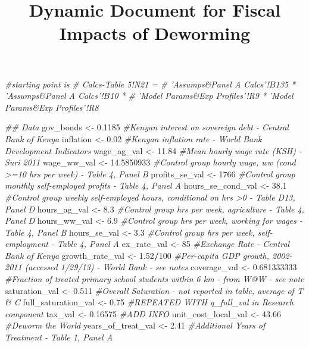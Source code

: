 \documentclass[]{article}
\title{Dynamic Document for Fiscal Impacts of Deworming}
\author{}
\date{}
\newenvironment{Shaded}{\begin{snugshade}}{\end{snugshade}}
\newcommand{\CommentTok}[1]{\textcolor[rgb]{0.56,0.35,0.01}{\textit{#1}}}
\newcommand{\DecValTok}[1]{\textcolor[rgb]{0.00,0.00,0.81}{#1}}
\newcommand{\FloatTok}[1]{\textcolor[rgb]{0.00,0.00,0.81}{#1}}
\newcommand{\NormalTok}[1]{#1}
\newcommand{\OperatorTok}[1]{\textcolor[rgb]{0.81,0.36,0.00}{\textbf{#1}}}
\newcommand{\StringTok}[1]{\textcolor[rgb]{0.31,0.60,0.02}{#1}}
\begin{document}
\maketitle

\def\blue{\color{blue}}

\begin{Shaded}
\begin{Highlighting}[]
\CommentTok{#starting point is}
\CommentTok{# Calcs-Table 5!N21 =}
\CommentTok{# 'Assumps&Panel A Calcs'!$B$135 * 'Assumps&Panel A Calcs'!$B$10 * }
\CommentTok{# 'Model Params&Exp Profiles'!R9 * 'Model Params&Exp Profiles'!R8}
\end{Highlighting}
\end{Shaded}

\begin{Shaded}
\begin{Highlighting}[]
\CommentTok{## Data }
\NormalTok{gov_bonds <-}\StringTok{    }\FloatTok{0.1185}            \CommentTok{#Kenyan interest on sovereign debt - Central Bank of Kenya}
\NormalTok{inflation <-}\StringTok{  }\FloatTok{0.02}              \CommentTok{#Kenyan inflation rate - World Bank Development Indicators}
\NormalTok{wage_ag_val <-}\StringTok{  }\FloatTok{11.84}             \CommentTok{#Mean hourly wage rate (KSH) - Suri 2011 }
\NormalTok{wage_ww_val <-}\StringTok{  }\FloatTok{14.5850933}      \CommentTok{#Control group hourly wage, ww (cond >=10 hrs per week) - Table 4, Panel B}
\NormalTok{profits_se_val <-}\StringTok{ }\DecValTok{1766}          \CommentTok{#Control group monthly self-employed profits - Table 4, Panel A}
\NormalTok{hours_se_cond_val <-}\StringTok{ }\FloatTok{38.1}       \CommentTok{#Control group weekly self-employed hours, conditional on hrs >0 - Table D13, Panel D}
\NormalTok{hours_ag_val <-}\StringTok{ }\FloatTok{8.3}             \CommentTok{#Control group hrs per week, agriculture - Table 4, Panel D}
\NormalTok{hours_ww_val <-}\StringTok{ }\FloatTok{6.9}             \CommentTok{#Control group hrs per week, working for wages - Table 4, Panel B}
\NormalTok{hours_se_val <-}\StringTok{ }\FloatTok{3.3}             \CommentTok{#Control group hrs per week, self-employment - Table 4, Panel A}
\NormalTok{ex_rate_val <-}\StringTok{ }\DecValTok{85}               \CommentTok{#Exchange Rate - Central Bank of Kenya }
\NormalTok{growth_rate_val <-}\StringTok{ }\FloatTok{1.52}\OperatorTok{/}\DecValTok{100}     \CommentTok{#Per-capita GDP growth, 2002-2011 (accessed 1/29/13) -  World Bank - see notes}
\NormalTok{coverage_val  <-}\StringTok{ }\FloatTok{0.681333333}    \CommentTok{#Fraction of treated primary school students within 6 km - from W@W - see note}
\NormalTok{saturation_val <-}\StringTok{  }\FloatTok{0.511}        \CommentTok{#Overall Saturation - not reported in table, average of T & C}
\NormalTok{full_saturation_val <-}\StringTok{ }\FloatTok{0.75}     \CommentTok{#REPEATED WITH q_full_val in Research component}
\NormalTok{tax_val <-}\StringTok{ }\FloatTok{0.16575}              \CommentTok{#ADD INFO}
\NormalTok{unit_cost_local_val <-}\StringTok{ }\FloatTok{43.66}    \CommentTok{#Deworm the World}
\NormalTok{years_of_treat_val <-}\StringTok{ }\FloatTok{2.41}      \CommentTok{#Additional Years of Treatment - Table 1, Panel A}
    

\end{Highlighting}
\end{Shaded}
\end{document}
